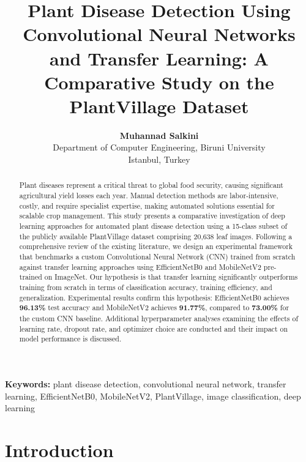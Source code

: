 \documentclass[10pt,twocolumn]{article}
\begin{document}
\title{Plant Disease Detection Using Convolutional Neural Networks and Transfer Learning: A Comparative Study on the PlantVillage Dataset}

\author{
  \textbf{Muhannad Salkini}\\
  \small Department of Computer Engineering, Biruni University\\
  \small Istanbul, Turkey
}

\date{}
\maketitle
\thispagestyle{fancy}

\begin{abstract}
Plant diseases represent a critical threat to global food security, causing significant agricultural yield losses each year. Manual detection methods are labor-intensive, costly, and require specialist expertise, making automated solutions essential for scalable crop management. This study presents a comparative investigation of deep learning approaches for automated plant disease detection using a 15-class subset of the publicly available PlantVillage dataset comprising 20,638 leaf images. Following a comprehensive review of the existing literature, we design an experimental framework that benchmarks a custom Convolutional Neural Network (CNN) trained from scratch against transfer learning approaches using EfficientNetB0 and MobileNetV2 pre-trained on ImageNet. Our hypothesis is that transfer learning significantly outperforms training from scratch in terms of classification accuracy, training efficiency, and generalization. Experimental results confirm this hypothesis: EfficientNetB0 achieves \textbf{96.13\%} test accuracy and MobileNetV2 achieves \textbf{91.77\%}, compared to \textbf{73.00\%} for the custom CNN baseline. Additional hyperparameter analyses examining the effects of learning rate, dropout rate, and optimizer choice are conducted and their impact on model performance is discussed.
\end{abstract}

\smallskip
\noindent\textbf{Keywords:} plant disease detection, convolutional neural network, transfer learning, EfficientNetB0, MobileNetV2, PlantVillage, image classification, deep learning

\section{Introduction}
\end{document}
